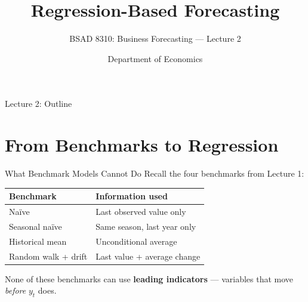 \documentclass[aspectratio=169, 11pt]{beamer}
\title{Regression-Based Forecasting}
\subtitle{BSAD 8310: Business Forecasting --- Lecture 2}
\author{Department of Economics}
\institute{University of Nebraska at Omaha}
\begin{document}

\begin{frame}
  \titlepage
\end{frame}

\begin{frame}{Lecture 2: Outline}
  \tableofcontents
\end{frame}

\section{From Benchmarks to Regression}


\begin{frame}{What Benchmark Models Cannot Do}
  Recall the four benchmarks from Lecture 1:
  \begin{center}
    \begin{tabular}{ll}
      \toprule
      \textbf{Benchmark} & \textbf{Information used} \\
      \midrule
      Na\"{i}ve & Last observed value only \\
      Seasonal na\"{i}ve & Same season, last year only \\
      Historical mean & Unconditional average \\
      Random walk + drift & Last value + average change \\
      \bottomrule
    \end{tabular}
  \end{center}
  \vspace{0.2cm}
  \begin{warningbox}
    None of these benchmarks can use \textbf{leading indicators} ---
    variables that move \emph{before} $y_t$ does.
  \end{warningbox}
\end{frame}
\end{document}
